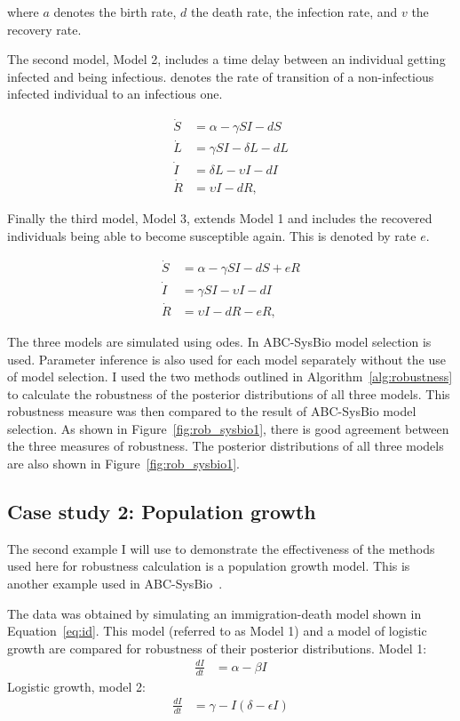 \noindent where $a$ denotes the birth rate, $d$ the death rate, \textgamma{} the infection rate, and $v$ the recovery rate.

The second model, Model 2, includes a time delay between an individual getting infected and being infectious. \textdelta{} denotes the rate of transition of a non-infectious infected individual to an infectious one.

\begin{align}
\dot S &= \alpha - \gamma SI - dS \\
\dot L &= \gamma SI - \delta L - dL \\
\dot I &= \delta L - \upsilon I - dI \\
\dot R &= \upsilon I - dR,
\end{align}

Finally the third model, Model 3, extends Model 1 and includes the recovered individuals being able to become susceptible again. This is denoted by rate $e$.

\begin{align}
\dot S &= \alpha - \gamma SI - dS + eR\\
\dot I &= \gamma SI - \upsilon I - dI \\
\dot R &= \upsilon I - dR - eR,
\end{align}

The three models are simulated using \acrshort{ode}s. In ABC-SysBio model selection is used. Parameter inference is also used for each model separately without the use of model selection. I used the two methods outlined in Algorithm~\ref{alg:robustness} to calculate the robustness of the posterior distributions of all three models. This robustness measure was then compared to the result of ABC-SysBio model selection. As shown in Figure~\ref{fig:rob_sysbio1}, there is good agreement between the three measures of robustness. The posterior distributions of all three models are also shown in Figure~\ref{fig:rob_sysbio1}.

\subsection{Case study 2: Population growth}
\label{sec:cs2}
The second example I will use to demonstrate the effectiveness of the methods used here for robustness calculation is a population growth model. This is another example used in ABC-SysBio~\autocite{Toni:2009tr}.

The data was obtained by simulating an immigration-death model shown in Equation~\ref{eq:id}. This model (referred to as Model 1) and a model of logistic growth are compared for robustness of their posterior distributions. 
Model 1:
\begin{align}
  \frac{dI}{dt} &= \alpha - \beta I \label{eq:id}
\end{align}
Logistic growth, model 2:
\begin{align}
  \frac{dI}{dt} &= \gamma - I	(\delta - \epsilon I)
\end{align}

